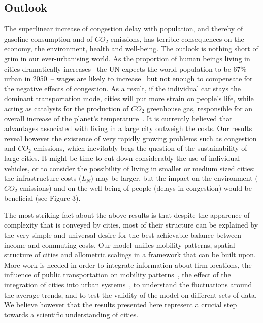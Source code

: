 \subsection{Outlook}

The superlinear increase of congestion delay with population, and thereby of gasoline consumption and of $CO_2$ emissions, has terrible consequences on the economy, the environment, health and well-being. The outlook is nothing short of grim in our ever-urbanising world. As the proportion of human beings living in cities dramatically increases --the UN expects the world population to be $67\%$ urban in 2050~\cite{UN:2011}-- wages are likely to increase~\cite{Bettencourt:2007} but not enough to compensate for the negative effects of congestion. As a result, if the individual car stays the dominant transportation mode, cities will put more strain on people's life, while acting as catalysts for the production of $CO_2$ greenhouse gas, responsible for an overall increase of the planet's temperature~\cite{Oreskes:2004}. It is currently believed that advantages associated with living in a large city outweigh the costs. Our results reveal however the existence of very rapidly growing problems such as congestion and $CO_2$ emissions, which inevitably begs the question of the sustainability of large cities. It might be time to cut down considerably the use of individual vehicles, or to consider the possibility of living in smaller or medium sized cities: the infrastructure costs ($L_N$) may be larger, but the impact on the environment ($CO_2$ emissions) and on the well-being of people (delays in congestion) would be beneficial (see Figure 3).

The most striking fact about the above results is that despite the apparence of complexity that is conveyed by cities, most of their structure can be explained by the very simple and universal desire for the best achievable balance between income and commuting costs. Our model unifies mobility patterns, spatial structure of cities and allometric scalings in a framework that can be built upon. More work is needed in order to integrate information about firm locations, the influence of public transportation on mobility patterns~\cite{Roth:2011}, the effect of the integration of cities into urban systems~\cite{Rozenblat:2007}, to understand the fluctuations around the average trends, and to test the validity of the model on different sets of data. We believe however that the results presented here represent a crucial step towards a scientific understanding of cities.


